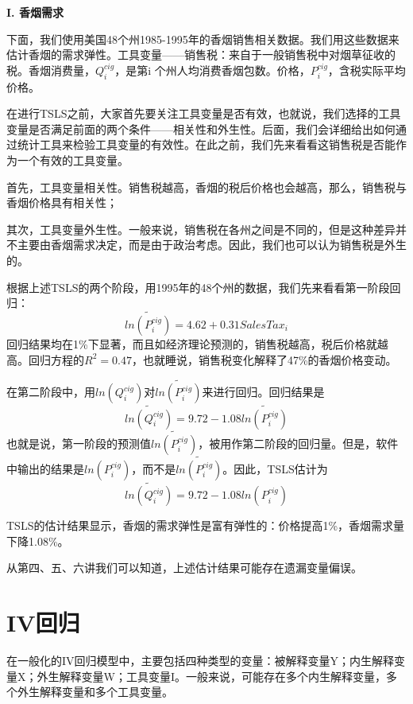\documentclass[cn,12pt,math=newtx,citestyle=gb7714-2015,bibstyle=gb7714-2015]{elegantbook}
\begin{document}
	\textbf{I. 香烟需求}
	
	下面，我们使用美国48个州1985-1995年的香烟销售相关数据。我们用这些数据来估计香烟的需求弹性。工具变量——销售税：来自于一般销售税中对烟草征收的税。香烟消费量，$Q_i^{cig}$，是第i 个州人均消费香烟包数。价格，$P_i^{cig}$，含税实际平均价格。
	
	在进行TSLS之前，大家首先要关注工具变量是否有效，也就说，我们选择的工具变量是否满足前面的两个条件——相关性和外生性。后面，我们会详细给出如何通过统计工具来检验工具变量的有效性。在此之前，我们先来看看这销售税是否能作为一个有效的工具变量。
	
	首先，工具变量相关性。销售税越高，香烟的税后价格也会越高，那么，销售税与香烟价格具有相关性；
	
	其次，工具变量外生性。一般来说，销售税在各州之间是不同的，但是这种差异并不主要由香烟需求决定，而是由于政治考虑。因此，我们也可以认为销售税是外生的。
	
	根据上述TSLS的两个阶段，用1995年的48个州的数据，我们先来看看第一阶段回归：
	\begin{equation}
		\tilde{ln(P_i^{cig})}=4.62+0.31SalesTax_i
	\end{equation}
	回归结果均在1\%下显著，而且如经济理论预测的，销售税越高，税后价格就越高。回归方程的$R^2=0.47$，也就睡说，销售税变化解释了47\%的香烟价格变动。
	
	在第二阶段中，用$ln(Q_i^{cig})$对$\tilde{ln(P_i^{cig})}$来进行回归。回归结果是
	\begin{equation}
		\tilde{ln(Q_i^{cig})}=9.72-1.08\tilde{ln(P_i^{cig})}
	\end{equation}
	也就是说，第一阶段的预测值$\tilde{ln(P_i^{cig})}$，被用作第二阶段的回归量。但是，软件中输出的结果是$ln(P_i^{cig})$，而不是$\tilde{ln(P_i^{cig})}$。因此，TSLS估计为
	\begin{equation}
		\tilde{ln(Q_i^{cig})}=9.72-1.08ln(P_i^{cig})
	\end{equation}
	
	TSLS的估计结果显示，香烟的需求弹性是富有弹性的：价格提高1\%，香烟需求量下降1.08\%。
	
	从第四、五、六讲我们可以知道，上述估计结果可能存在遗漏变量偏误。
	
	\section{IV回归}
	在一般化的IV回归模型中，主要包括四种类型的变量：被解释变量Y；内生解释变量X；外生解释变量W；工具变量I。一般来说，可能存在多个内生解释变量，多个外生解释变量和多个工具变量。
	
\end{document}
